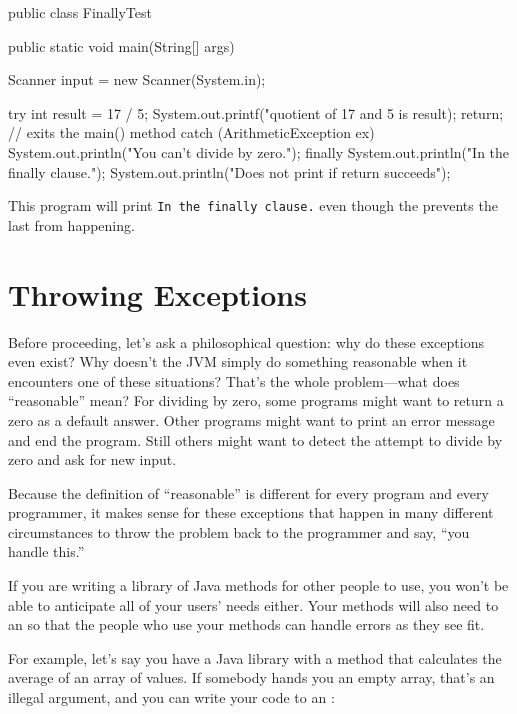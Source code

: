 \begin{code}
public class FinallyTest {

    public static void main(String[] args) {
        Scanner input = new Scanner(System.in);
        
        try {
            int result = 17 / 5;
            System.out.printf("quotient of 17 and 5 is %
               result);
            return; // exits the main() method
        }
        catch (ArithmeticException ex) {
            System.out.println("You can't divide by zero.");
        }
        finally {
            System.out.println("In the finally clause.");
        }
        System.out.println("Does not print if return succeeds");
    }
}
\end{code}

This program will print \texttt{In the finally clause.} even though the  prevents the last  from happening.

\section{Throwing Exceptions}
Before proceeding, let's ask a philosophical question: why do these exceptions even exist? Why doesn't the JVM simply do something reasonable when it encounters one of these situations?  That's the whole problem---what does ``reasonable'' mean? For dividing by zero, some programs might want to return a zero as a default answer. Other programs might want to print an error message and end the program. Still others might want to detect the attempt to divide by zero and ask for new input.

Because the definition of ``reasonable'' is different for every program and every programmer, it makes sense for these exceptions that happen in many different circumstances to throw the problem back to the programmer and say, ``you handle this.'' 

If you are writing a library of Java methods for other people to use, you won't be able to anticipate all of your users' needs either. Your methods will also need to  an  so that the people who use your methods can handle errors as they see fit.

For example, let's say you have a Java library with a method that calculates the average of an array of  values. If somebody hands you an empty array, that's an illegal argument, and you can write your code to  an :

